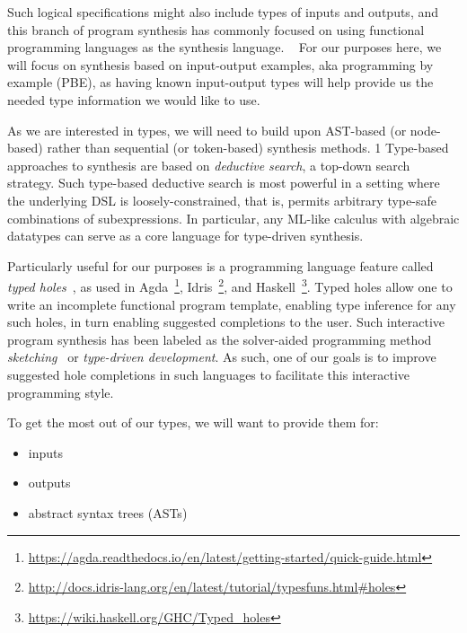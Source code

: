 \documentclass{article}
\begin{document}
Such logical specifications might also include types of inputs and outputs,
and this branch of program synthesis has commonly focused on using functional programming languages as the synthesis language.%
~\citep{synquid,eguchi2018automated,scythe,scout,gissurarson2018suggesting,idris,lenses}
For our purposes here, we will focus on synthesis based on input-output examples, aka programming by example (PBE),
as having known input-output types will help provide us the needed type information we would like to use.

As we are interested in types, we will need to build upon AST-based (or node-based) rather than sequential (or token-based) synthesis methods.
1  %
Type-based approaches to synthesis are based on \emph{deductive search}, a top-down search strategy.
Such type-based deductive search is most powerful in a setting where the underlying DSL is loosely-constrained,
that is, permits arbitrary type-safe combinations of subexpressions.
In particular, any ML-like calculus with algebraic datatypes can serve as a core language for type-driven synthesis.~\citep{gulwani2017program}

Particularly useful for our purposes is a programming language feature called \emph{typed holes}~\citep{hashimoto1997typed},
as used in Agda~\footnote{\url{https://agda.readthedocs.io/en/latest/getting-started/quick-guide.html}},
Idris~\footnote{\url{http://docs.idris-lang.org/en/latest/tutorial/typesfuns.html\#holes}},
and Haskell~\footnote{\url{https://wiki.haskell.org/GHC/Typed_holes}}.
Typed holes allow one to write an incomplete functional program template,
enabling type inference for any such holes, in turn enabling suggested completions to the user.
Such interactive program synthesis has been labeled as the solver-aided
programming method \emph{sketching}~\citep{gulwani2017program} or
\emph{type-driven development}.
As such, one of our goals is to improve suggested hole completions in such languages to facilitate this interactive programming style.

To get the most out of our types, we will want to provide them for:
\begin{itemize}
    \item inputs
    \item outputs
    \item abstract syntax trees (ASTs)
\end{itemize}
\end{document}
